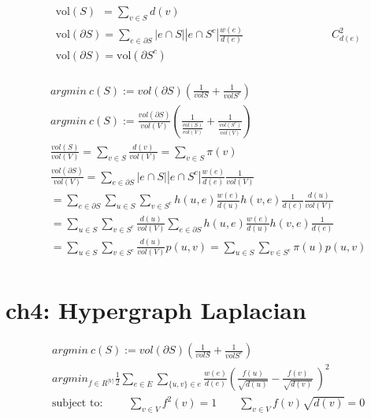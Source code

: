 \documentclass{article}
\begin{document}
%
\begin{align*}
    & \text{vol}(S) \ \ = \sum_{v \in S} d(v)  \\[3pt]
    & \text{vol}(\partial S) = \sum_{e \in \partial S} 
      |e \cap S||e \cap S^{c}| \frac{w(e)}{d(e)} 
      \qquad \qquad \qquad \qquad C_{d(e)}^{2}  \\[3pt]
    & \text{vol}(\partial S) = \text{vol}(\partial S^{c})  \\[3pt]
\end{align*}


%
\begin{align*}
    & argmin \ c(S) := vol(\partial S) (\frac{1}{volS} + \frac{1}{volS^{c}})  \\[3pt]
    & argmin \ c(S) := \frac{vol(\partial S)}{vol(V)} 
    (\frac{1}{ \frac{vol(S)}{vol(V)} } + 
     \frac{1}{ \frac{vol(S^{c})}{vol(V)} })  \\[3pt]
    & \frac{vol(S)}{vol(V)} 
      = \sum_{v \in S} \frac{d(v)}{vol(V)} 
      = \sum_{v \in S} \pi (v)  \\[3pt]
    & \frac{vol(\partial S)}{vol(V)} = \sum_{e \in \partial S} 
      |e \cap S||e \cap S^{c}| \frac{w(e)}{d (e)} 
      \frac{1}{vol(V)}  \\[3pt]
    & = \sum_{e \in \partial S} \sum_{u \in S} \sum_{v \in S^{c}} 
        h(u, e) \frac{w(e)}{d(u)} h(v, e) \frac{1}{d(e)} 
        \frac{d(u)}{vol(V)}  \\[3pt]
    & = \sum_{u \in S} \sum_{v \in S^{c}} \frac{d(u)}{vol(V)} 
        \sum_{e \in \partial S} h(u, e) \frac{w(e)}{d(u)} h(v, e) \frac{1}{d(e)}  \\[3pt]
    & = \sum_{u \in S} \sum_{v \in S^{c}} \frac{d(u)}{vol(V)} p(u, v) 
      = \sum_{u \in S} \sum_{v \in S^{c}} \pi (u) p(u, v)  \\[3pt]
\end{align*}


\newpage
\section*{ch4: Hypergraph Laplacian}


\begin{align*}
    & argmin \ c(S) := vol(\partial S) (\frac{1}{volS} + \frac{1}{volS^{c}})  \\[3pt]
    & argmin_{f \in R^{|V|}} \frac{1}{2} 
      \sum_{e \in E} \sum_{\{u, v\} \in e} 
      \frac{w(e)}{d(e)} 
      \left( \frac{f(u)}{\sqrt{d(u)}} - \frac{f(v)}{\sqrt{d(v)}}\ \right)^2  \\[3pt]
    & \text{subject to: } \qquad 
      \sum_{v \in V} f^2(v)=1 \qquad 
      \sum_{v \in V} f(v) \sqrt{d(v)} = 0  \\[3pt]
\end{align*}
\end{document}
